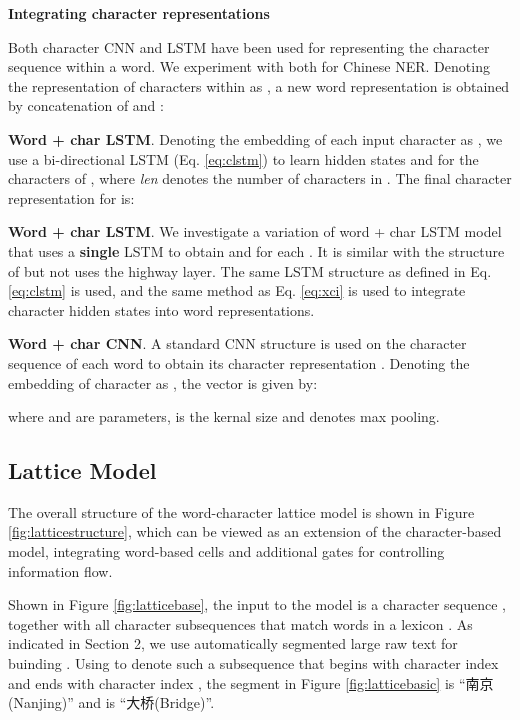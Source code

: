 \documentclass[11pt,a4paper]{article}
\begin{document}
\begin{CJK*}{UTF8}{gbsn}
\textbf{Integrating character representations}

Both character CNN \cite{ma2016end} and LSTM \cite{lample2016neural} have been used for representing the character sequence within a word. We experiment with both for Chinese NER. Denoting the representation of characters within  as , a new word representation is obtained by concatenation of  and :



\noindent  \textbullet \; \textbf{Word + char LSTM}. Denoting the embedding of each input character as , we use a bi-directional LSTM (Eq. \ref{eq:clstm}) to learn hidden states  and  for the characters  of , where \textit{len} denotes the number of characters in . The final character representation for  is:


\noindent \textbullet \; \textbf{Word + char LSTM}. We investigate a variation of word + char LSTM model that uses a \textbf{single} LSTM to obtain  and  for each . It is similar with the structure of  but not uses the highway layer. The same LSTM structure as defined in Eq. \ref{eq:clstm} is used, and the same method as Eq. \ref{eq:xci} is used to integrate character hidden states into word representations. 

\noindent \textbullet \; \textbf{Word + char CNN}. A standard CNN \cite{lecun1989backpropagation} structure is used on the character sequence of each word to obtain its character representation . Denoting the embedding of character  as , the vector  is given by:

where  and  are parameters,  is the kernal size and  denotes max pooling.




\subsection{Lattice Model}
The overall structure of the word-character lattice model is shown in Figure \ref{fig:latticestructure}, which can be viewed as an extension of the character-based model, integrating word-based cells and additional gates for controlling information flow.  

Shown in Figure \ref{fig:latticebase}, the input to the model is a character sequence , together with all character subsequences that match words in a lexicon . As indicated in Section 2, we use automatically segmented large raw text for buinding . Using  to denote such a subsequence that begins with character index  and ends with character index , the segment  in Figure \ref{fig:latticebasic} is ``南京\;(Nanjing)'' and  is ``大桥\;(Bridge)''. 


\end{CJK*}
\end{document}
